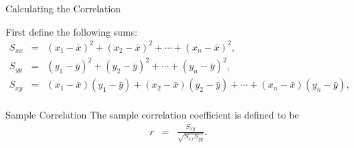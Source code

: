 \begin{frame}{Calculating the Correlation}

  First define the following sums:
  \begin{eqnarray*}
    S_{xx} & = & (x_1-\bar{x})^2 + (x_2-\bar{x})^2 + \cdots + (x_n-\bar{x})^2, \\
    S_{yy} & = & (y_1-\bar{y})^2 + (y_2-\bar{y})^2 + \cdots + (y_n-\bar{y})^2, \\
    S_{xy} & = & (x_1-\bar{x})(y_1-\bar{y}) + (x_2-\bar{x})(y_2-\bar{y}) + \cdots + (x_n-\bar{x})(y_n-\bar{y}), \\
  \end{eqnarray*}

  {
    
    \begin{definition}{Sample Correlation}
      The sample correlation coefficient is defined to be
      \begin{eqnarray*}
        r & = & \frac{S_{xy}}{\sqrt{S_{xx} S_{yy}}}.
      \end{eqnarray*}
    \end{definition}

  }
  
\end{frame}


